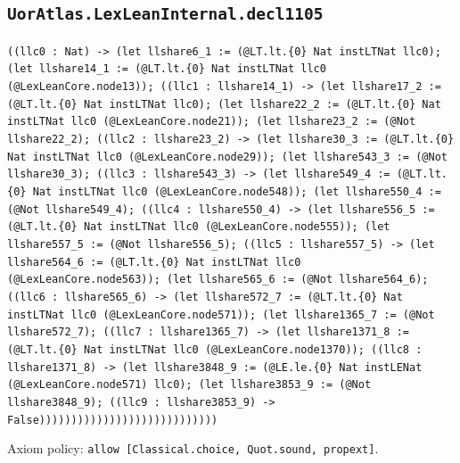 \documentclass[11pt]{article}
\begin{document}
\subsection*{\texttt{UorAtlas.LexLeanInternal.decl1105}}
\noindent\texttt{((llc0 : Nat) -> (let llshare6\_1 := (@LT.lt.\{0\} Nat instLTNat llc0); (let llshare14\_1 := (@LT.lt.\{0\} Nat instLTNat llc0 (@LexLeanCore.node13)); ((llc1 : llshare14\_1) -> (let llshare17\_2 := (@LT.lt.\{0\} Nat instLTNat llc0); (let llshare22\_2 := (@LT.lt.\{0\} Nat instLTNat llc0 (@LexLeanCore.node21)); (let llshare23\_2 := (@Not llshare22\_2); ((llc2 : llshare23\_2) -> (let llshare30\_3 := (@LT.lt.\{0\} Nat instLTNat llc0 (@LexLeanCore.node29)); (let llshare543\_3 := (@Not llshare30\_3); ((llc3 : llshare543\_3) -> (let llshare549\_4 := (@LT.lt.\{0\} Nat instLTNat llc0 (@LexLeanCore.node548)); (let llshare550\_4 := (@Not llshare549\_4); ((llc4 : llshare550\_4) -> (let llshare556\_5 := (@LT.lt.\{0\} Nat instLTNat llc0 (@LexLeanCore.node555)); (let llshare557\_5 := (@Not llshare556\_5); ((llc5 : llshare557\_5) -> (let llshare564\_6 := (@LT.lt.\{0\} Nat instLTNat llc0 (@LexLeanCore.node563)); (let llshare565\_6 := (@Not llshare564\_6); ((llc6 : llshare565\_6) -> (let llshare572\_7 := (@LT.lt.\{0\} Nat instLTNat llc0 (@LexLeanCore.node571)); (let llshare1365\_7 := (@Not llshare572\_7); ((llc7 : llshare1365\_7) -> (let llshare1371\_8 := (@LT.lt.\{0\} Nat instLTNat llc0 (@LexLeanCore.node1370)); ((llc8 : llshare1371\_8) -> (let llshare3848\_9 := (@LE.le.\{0\} Nat instLENat (@LexLeanCore.node571) llc0); (let llshare3853\_9 := (@Not llshare3848\_9); ((llc9 : llshare3853\_9) -> False))))))))))))))))))))))))))))}\par
\noindent Axiom policy: \texttt{allow [Classical.choice, Quot.sound, propext]}.\par
\end{document}
